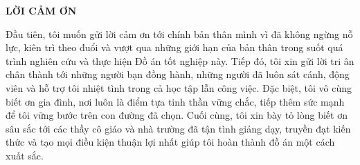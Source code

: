\documentclass[../DoAn.tex]{subfiles}
\begin{document}
\begin{center}
    \Large{\textbf{LỜI CẢM ƠN}}\\
\end{center}
\vspace{1cm}
\hspace{\parindent}Đầu tiên, tôi muốn gửi lời cảm ơn tới chính bản thân mình vì đã không ngừng nỗ lực, kiên trì theo đuổi và vượt qua những giới hạn của bản thân trong suốt quá trình nghiên cứu và thực hiện Đồ án tốt nghiệp này. Tiếp đó, tôi xin gửi lời tri ân chân thành tới những người bạn đồng hành, những người đã luôn sát cánh, động viên và hỗ trợ tôi nhiệt tình trong cả học tập lẫn công việc. Đặc biệt, tôi vô cùng biết ơn gia đình, nơi luôn là điểm tựa tinh thần vững chắc, tiếp thêm sức mạnh để tôi vững bước trên con đường đã chọn. Cuối cùng, tôi xin bày tỏ lòng biết ơn sâu sắc tới các thầy cô giáo và nhà trường đã tận tình giảng dạy, truyền đạt kiến thức và tạo mọi điều kiện thuận lợi nhất giúp tôi hoàn thành đồ án một cách xuất sắc.
\end{document}

